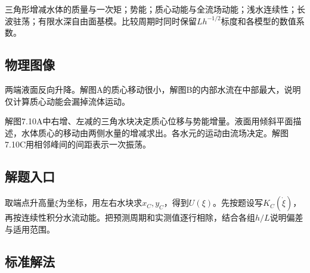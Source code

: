 \documentclass[UTF8,fontset=fandol,a4paper,11pt]{ctexart}
\begin{document}
三角形增减水体的质量与一次矩；势能；质心动能与全流场动能；浅水连续性；长波驻荡；有限水深自由面基模。比较周期时同时保留$Lh^{-1/2}$标度和各模型的数值系数。




\subsection*{物理图像}

两端液面反向升降。解图A的质心移动很小，解图B的内部水流在中部最大，说明仅计算质心动能会漏掉流体运动。

解图7.10A中右增、左减的三角水块决定质心位移与势能增量。液面用倾斜平面描述，水体质心的移动由两侧水量的增减求出。各水元的运动由流场决定。解图7.10C用相邻峰间的间距表示一次振荡。




\subsection*{解题入口}

取端点升高量$\xi$为坐标，用左右水块求$x_C,y_C$，得到$U(\xi)$。先按题设写$K_C(\dot\xi)$，再按连续性积分水流动能。把预测周期和实测值逐行相除，结合各组$h/L$说明偏差与适用范围。



\subsection*{标准解法}
\end{document}
